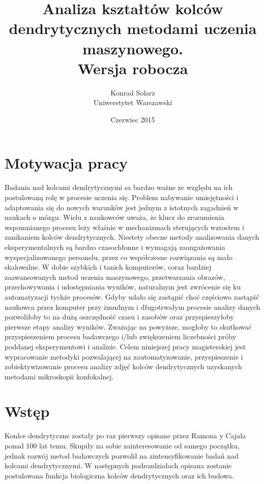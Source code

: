 \documentclass{article}
\begin{document}
\title{Analiza kształtów kolców dendrytycznych metodami uczenia maszynowego.\\Wersja robocza}
\author{Konrad Solarz\\Uniwerstytet Warszawski}
\date{Czerwiec 2015}
\maketitle
\clearpage
\begin{abstract}


\end{abstract}
\clearpage

\tableofcontents

\listoffigures

\listofalgorithms
\clearpage

\section{Motywacja pracy}
Badania nad kolcami dendrytycznymi sa bardzo ważne ze względu na ich postulowaną rolę w procesie uczenia się.
Problem nabywanie umiejętności i adaptowania się do nowych warunków jest jednym z istotnych zagadnień w naukach o mózgu.
Wielu z naukowców uważa, że klucz do zrozumienia wspomnianego procesu leży właśnie w mechanizmach sterujących wzrostem i zanikaniem kolców dendrytycznych.
Niestety obecne metody analizowania danych eksperymentalnych są bardzo czasochłonne i wymagają zaangażowania wyspecjalizowanego personelu, przez co współczesne rozwiązania są mało skalowalne.
W dobie szybkich i tanich komputerów, coraz bardziej zaawansowanych metod uczenia maszynowego, przetwarzania obrazów, przechowywania i udostępniania wyników, naturalnym jest zwrócenie się ku automatyzacji tychże procesów.
Gdyby udało się zastąpić choć częściowo zastąpić naukowca przez komputer przy żmudnym i długotrwałym procesie analizy danych pozwoliłoby to na dużą oszczędność czasu i zasobów oraz przyspieszyłoby pierwsze etapy analizy wyników.
Zważając na powyższe, mogłoby to skutkować przyspieszeniem procesu badawczego i/lub zwiększeniem liczebności próby poddanej eksperymentowi i analizie.
Celem niniejszej pracy magisterskiej jest wypracowanie metodyki pozwalającej na zautomatyzowanie, przyspieszenie i zobiektywizowanie procesu analizy zdjęć kolców dendrytycznych uzyskanych metodami mikroskopii konfokalnej.



\section{Wstęp}
Konlce dendrytyczne zostały po raz pierwszy opisane przez Ramona y Cajala ponad 100 lat temu. %
Skupiły na sobie zainteresowanie od samego początku, jednak rozwój metod badawczych 
pozwolił na zintensyfikowanie badań nad kolcami dendrytycznymi. W następnych podrozdziałach opisana zostanie postulowana funkcja biologiczna kolców dendrytycznych oraz ich budowa.
\end{document}
